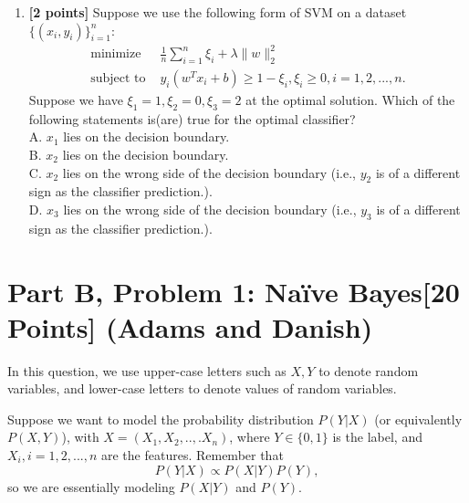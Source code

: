 \documentclass{article}
\begin{document}
\begin{enumerate}
		\item \textbf{[2 points]} Suppose we use the following form of SVM on a dataset $\{(x_i,y_i)\}_{i=1}^n$:
		\begin{align*}
		\text{minimize}\; & \frac{1}{n}\sum_{i=1}^n \xi_i+\lambda\|w\|_2^2\\
		\text{subject to } & y_i(w^Tx_i+b)\geq 1-\xi_i, \xi_i\geq 0, i=1,2,...,n.
		\end{align*}
		Suppose we have $\xi_1=1, \xi_2=0, \xi_3=2$ at the optimal solution. Which of the following statements is(are) true for the optimal classifier?\\
		A. $x_1$ lies on the decision boundary.\\
		B. $x_2$ lies on the decision boundary.\\
		C. $x_2$ lies on the wrong side of the decision boundary (i.e., $y_2$ is of a different sign as the classifier prediction.).\\
		D. $x_3$ lies on the wrong side of the decision boundary (i.e., $y_3$ is of a different sign as the classifier prediction.).\\

	\end{enumerate}
	\clearpage


\section*{Part B, Problem 1: Na{\"i}ve Bayes[20 Points] (Adams and Danish)}

In this question, we use upper-case letters such as $X,Y$ to denote random variables, and lower-case letters to denote values of random variables.

Suppose we want to model the probability distribution $P(Y|X)$ (or equivalently $P(X,Y)$), with $X=(X_1,X_2,..,.X_n)$, where $Y\in \{0, 1\}$ is the label, and $X_i, i=1,2,...,n$ are the features. Remember that
\begin{equation}\label{eqn:pxy}
P(Y|X)\propto P(X|Y)P(Y),
\end{equation}
so we are essentially modeling $P(X|Y)$ and $P(Y)$.
\end{document}
